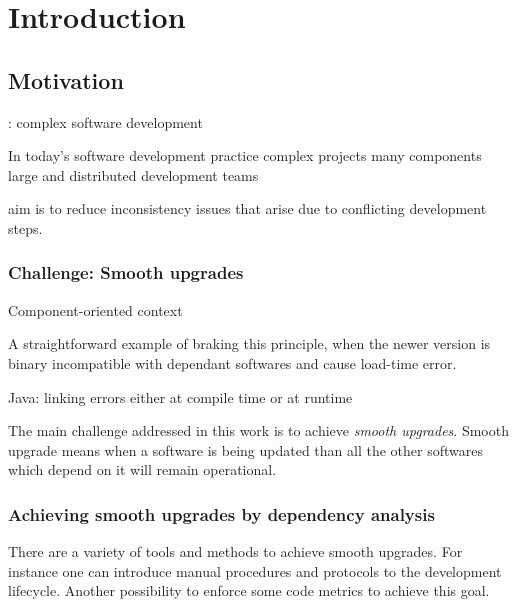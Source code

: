 \chapter{Introduction}

\section{Motivation}

: complex software development

In today's software development practice
complex projects
many components
large and distributed development teams

aim is to reduce inconsistency issues that arise due to 
conflicting development steps. 


\subsection{Challenge: Smooth upgrades}

Component-oriented context

A straightforward example of braking this principle,
when the newer version is binary incompatible with dependant softwares and cause
load-time error.

Java: linking errors either at compile time or at runtime


The main challenge addressed in this work is to achieve \emph{smooth upgrades}. Smooth upgrade means
when a software is being updated than all the other softwares which depend on it
will remain operational. 


\subsection{Achieving smooth upgrades by dependency analysis}
There are a variety of tools and methods to achieve smooth upgrades. For
instance one can introduce manual procedures and protocols to the development
lifecycle. Another possibility to enforce some code metrics to achieve this
goal.


